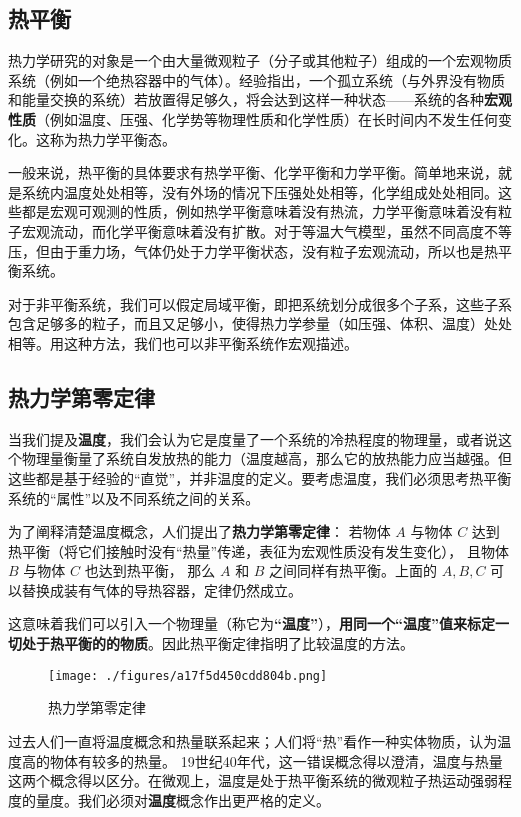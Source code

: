 
\begin{issues}
\issueDraft
\end{issues}

\subsection{热平衡}
热力学研究的对象是一个由大量微观粒子（分子或其他粒子）组成的一个宏观物质系统（例如一个绝热容器中的气体）。经验指出，一个孤立系统（与外界没有物质和能量交换的系统）若放置得足够久，将会达到这样一种状态——系统的各种\textbf{宏观性质}（例如温度、压强、化学势等物理性质和化学性质）在长时间内不发生任何变化。这称为热力学平衡态。

一般来说，热平衡的具体要求有热学平衡、化学平衡和力学平衡。简单地来说，就是系统内温度处处相等，没有外场的情况下压强处处相等，化学组成处处相同。这些都是宏观可观测的性质，例如热学平衡意味着没有热流，力学平衡意味着没有粒子宏观流动，而化学平衡意味着没有扩散。对于等温大气模型，虽然不同高度不等压，但由于重力场，气体仍处于力学平衡状态，没有粒子宏观流动，所以也是热平衡系统。

对于非平衡系统，我们可以假定局域平衡，即把系统划分成很多个子系，这些子系包含足够多的粒子，而且又足够小，使得热力学参量（如压强、体积、温度）处处相等。用这种方法，我们也可以非平衡系统作宏观描述。

\subsection{热力学第零定律}
当我们提及\textbf{温度}，我们会认为它是度量了一个系统的冷热程度的物理量，或者说这个物理量衡量了系统自发放热的能力（温度越高，那么它的放热能力应当越强。但这些都是基于经验的“直觉”，并非温度的定义。要考虑温度，我们必须思考热平衡系统的“属性”以及不同系统之间的关系。

为了阐释清楚温度概念，人们提出了\textbf{热力学第零定律}：
若物体 $A$ 与物体 $C$ 达到热平衡（将它们接触时没有“热量”传递，表征为宏观性质没有发生变化）， 且物体 $B$ 与物体 $C$ 也达到热平衡， 那么 $A$ 和 $B$ 之间同样有热平衡。上面的 $A,B,C$ 可以替换成装有气体的导热容器，定律仍然成立。

这意味着我们可以引入一个物理量（称它为\textbf{“温度”}），\textbf{用同一个“温度”值来标定一切处于热平衡的的物质}。因此热平衡定律指明了比较温度的方法。
\begin{figure}[ht]
\centering
\texttt{[image: ./figures/a17f5d450cdd804b.png]}
\caption{热力学第零定律} \label{fig_TherEq_1}
\end{figure}

过去人们一直将温度概念和热量联系起来；人们将“热”看作一种实体物质，认为温度高的物体有较多的热量。 19世纪40年代，这一错误概念得以澄清，温度与热量这两个概念得以区分。在微观上，温度是处于热平衡系统的微观粒子热运动强弱程度的量度。我们必须对\textbf{温度}概念作出更严格的定义。

